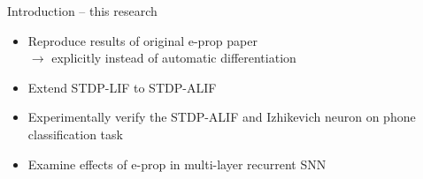 \documentclass[t]{beamer}
\begin{document}
  \begin{frame}{Introduction -- this research}

    \begin{itemize}[label=--]
      \item Reproduce results of original e-prop paper\\$\rightarrow$ explicitly instead of automatic differentiation
      \item Extend STDP-LIF to STDP-ALIF
      \item Experimentally verify the STDP-ALIF and Izhikevich neuron on phone classification task
      \item Examine effects of e-prop in multi-layer recurrent SNN
    \end{itemize}
  \end{frame}
\end{document}
